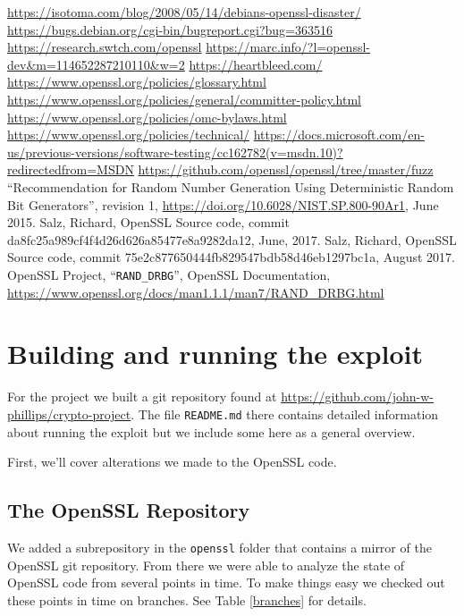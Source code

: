 \documentclass[conference]{IEEEtran}
\begin{document}
\begin{thebibliography}{00}
 \url{https://isotoma.com/blog/2008/05/14/debians-openssl-disaster/}
 \url{https://bugs.debian.org/cgi-bin/bugreport.cgi?bug=363516}
 \url{https://research.swtch.com/openssl}
 \url{https://marc.info/?l=openssl-dev&m=114652287210110&w=2}
 \url{https://heartbleed.com/}
 \url{https://www.openssl.org/policies/glossary.html}
 \url{https://www.openssl.org/policies/general/committer-policy.html}
 \url{https://www.openssl.org/policies/omc-bylaws.html}
 \url{https://www.openssl.org/policies/technical/}
 \url{https://docs.microsoft.com/en-us/previous-versions/software-testing/cc162782(v=msdn.10)?redirectedfrom=MSDN}
 \url{https://github.com/openssl/openssl/tree/master/fuzz}
 ``Recommendation for Random Number Generation Using
  Deterministic Random Bit Generators'', revision 1,
  \url{https://doi.org/10.6028/NIST.SP.800-90Ar1}, June 2015.
 Salz, Richard, OpenSSL Source code, commit da8fc25a989cf4f4d26d626a85477e8a9282da12, June, 2017.
 Salz, Richard, OpenSSL Source code, commit 75e2c877650444fb829547bdb58d46eb1297bc1a, August 2017.
 OpenSSL Project, ``\verb|RAND_DRBG|'', OpenSSL
  Documentation,
  \url{https://www.openssl.org/docs/man1.1.1/man7/RAND_DRBG.html}
\end{thebibliography}
\appendices{}
\section{Building and running the exploit}
For the project we built a git repository found at
\url{https://github.com/john-w-phillips/crypto-project}. The file
\verb|README.md| there contains detailed information about running the
exploit but we include some here as a general overview.

First, we'll cover alterations we made to the OpenSSL code.

\subsection{The OpenSSL Repository}
We added a subrepository in the \verb|openssl| folder that contains a
mirror of the OpenSSL git repository. From there we were able to
analyze the state of OpenSSL code from several points in time. To make
things easy we checked out these points in time on branches. See
Table \ref{branches} for details.
\end{document}
